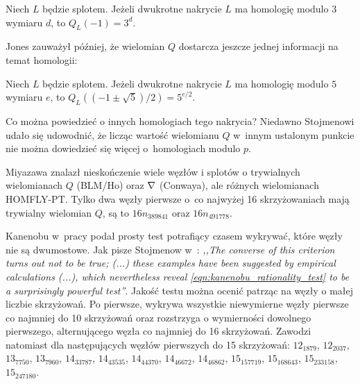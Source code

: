 \begin{proposition}
%
%
    Niech $L$ będzie splotem.
    Jeżeli dwukrotne nakrycie $L$ ma homologię modulo $3$ wymiaru $d$, to $Q_L(-1) = 3^d$.
\end{proposition}

Jones zauważył później, że wielomian $Q$ dostarcza jeszcze jednej informacji na temat homologii:

\begin{proposition}
%
%
    Niech $L$ będzie splotem.
    Jeżeli dwukrotne nakrycie $L$ ma homologię modulo $5$ wymiaru $e$, to $Q_L((-1 \pm \sqrt 5)/2) = 5^{e/2}$.
\end{proposition}

Co można powiedzieć o innych homologiach tego nakrycia?
Niedawno Stojmenowi \cite{stoimenowa2002} udało się udowodnić, że licząc wartość wielomianu $Q$ w~innym ustalonym punkcie nie można dowiedzieć się więcej o~homologiach modulo $p$.

Miyazawa \cite{miyazawa2019} znalazł nieskończenie wiele węzłów i splotów o trywialnych wielomianach $Q$ (BLM/Ho) oraz $\nabla$ (Conwaya), ale różnych wielomianach HOMFLY-PT.
%
Tylko dwa węzły pierwsze o~co najwyżej 16 skrzyżowaniach mają trywialny wielomian $Q$, są to $16n_{389841}$ oraz $16n_{491778}$.

Kanenobu w~pracy \cite{kanenobu1989} podał prosty test potrafiący czasem wykrywać, które węzły nie są dwumostowe.
%
Jak pisze Stojmenow w~\cite{stoimenow2000}: \emph{,,The converse of this criterion turns out not to be true; (...) these examples have been suggested by empirical calculations (...), which nevertheless reveal \ref{eqn:kanenobu_rationality_test} to be a surprisingly powerful test''}.
%
Jakość testu można ocenić patrząc na węzły o małej liczbie skrzyżowań.
Po pierwsze, wykrywa wszystkie niewymierne węzły pierwsze co najmniej do 10 skrzyżowań oraz rozstrzyga o wymierności dowolnego pierwszego, alternującego węzła co najmniej do 16 skrzyżowań.
Zawodzi natomiast dla następujących węzłów pierwszych do 15 skrzyżowań: $12_{1879}$, $12_{2037}$, $13_{7750}$, $13_{7960}$, $14_{33787}$, $14_{43535}$, $14_{44370}$, $14_{46672}$, $14_{46862}$, $15_{157719}$, $15_{168643}$, $15_{233158}$, $15_{247180}$.

